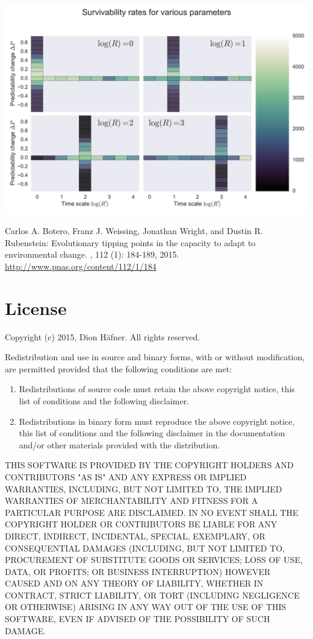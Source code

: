 \documentclass[
12pt, %
a4paper, %
headinclude,footinclude %
]{article}
\begin{document}
\includegraphics[width=\linewidth]{tipping}

\begin{thebibliography}{99}
  Carlos A. Botero, Franz J. Weissing, Jonathan Wright, and Dustin R. Rubenstein:
  \newblock Evolutionary tipping points in the capacity to adapt to environmental change.
  , 112 (1): 184-189, 2015. \\
  \newblock \url{http://www.pnas.org/content/112/1/184}
\end{thebibliography}

\section*{License}
Copyright (c) 2015, Dion H\"afner.
All rights reserved.

Redistribution and use in source and binary forms, with or without modification, are permitted provided that the following conditions are met:

\begin{enumerate}
	\item Redistributions of source code must retain the above copyright notice, this list of conditions and the following disclaimer.
	
	\item Redistributions in binary form must reproduce the above copyright notice, this list of conditions and the following disclaimer in the documentation and/or other materials provided with the distribution.
\end{enumerate}

THIS SOFTWARE IS PROVIDED BY THE COPYRIGHT HOLDERS AND CONTRIBUTORS "AS IS" AND ANY EXPRESS OR IMPLIED WARRANTIES, INCLUDING, BUT NOT LIMITED TO, THE IMPLIED WARRANTIES OF MERCHANTABILITY AND FITNESS FOR A PARTICULAR PURPOSE ARE DISCLAIMED. IN NO EVENT SHALL THE COPYRIGHT HOLDER OR CONTRIBUTORS BE LIABLE FOR ANY DIRECT, INDIRECT, INCIDENTAL, SPECIAL, EXEMPLARY, OR CONSEQUENTIAL DAMAGES (INCLUDING, BUT NOT LIMITED TO, PROCUREMENT OF SUBSTITUTE GOODS OR SERVICES; LOSS OF USE, DATA, OR PROFITS; OR BUSINESS INTERRUPTION) HOWEVER CAUSED AND ON ANY THEORY OF LIABILITY, WHETHER IN CONTRACT, STRICT LIABILITY, OR TORT (INCLUDING NEGLIGENCE OR OTHERWISE) ARISING IN ANY WAY OUT OF THE USE OF THIS SOFTWARE, EVEN IF ADVISED OF THE POSSIBILITY OF SUCH DAMAGE.
\end{document}
